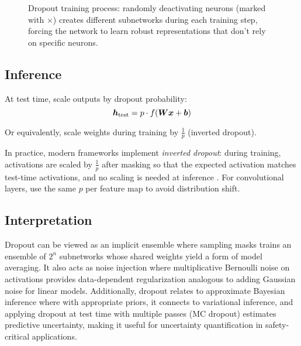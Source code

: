 \begin{figure}[htbp]
\caption{Dropout training process: randomly deactivating neurons (marked with $\times$) creates different subnetworks during each training step, forcing the network to learn robust representations that don't rely on specific neurons.}
\label{fig:dropout-training-process}
\end{figure}

\subsection{Inference}

At test time, scale outputs by dropout probability:
\begin{equation}
\boldsymbol{h}_{\text{test}} = p \cdot f(\boldsymbol{W}\boldsymbol{x} + \boldsymbol{b})
\end{equation}

Or equivalently, scale weights during training by $\frac{1}{p}$ (inverted dropout).

In practice, modern frameworks implement \emph{inverted dropout}: during training, activations are scaled by $\tfrac{1}{p}$ after masking so that the expected activation matches test-time activations, and no scaling is needed at inference \cite{Srivastava2014,GoodfellowEtAl2016}. For convolutional layers, use the same $p$ per feature map to avoid distribution shift.

\subsection{Interpretation}

Dropout can be viewed as an implicit ensemble where sampling masks trains an ensemble of $2^n$ subnetworks whose shared weights yield a form of model averaging. It also acts as noise injection where multiplicative Bernoulli noise on activations provides data-dependent regularization analogous to adding Gaussian noise for linear models. Additionally, dropout relates to approximate Bayesian inference where with appropriate priors, it connects to variational inference, and applying dropout at test time with multiple passes (MC dropout) estimates predictive uncertainty, making it useful for uncertainty quantification in safety-critical applications.

